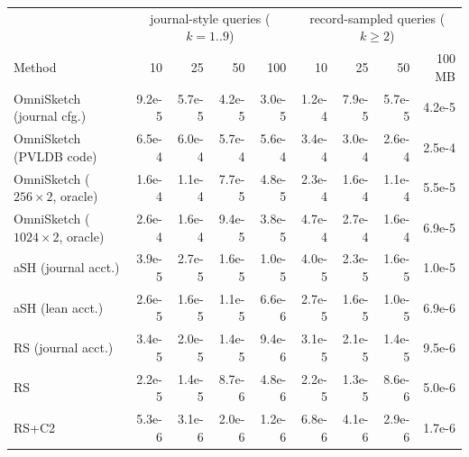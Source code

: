 \begin{tabular}{lrrrrrrrr}
\toprule
 & \multicolumn{4}{c}{journal-style queries ($k=1..9$)} & \multicolumn{4}{c}{record-sampled queries ($k\ge2$)} \\
Method & 10 & 25 & 50 & 100 & 10 & 25 & 50 & 100 MB \\
\midrule
OmniSketch (journal cfg.) & 9.2e-5 & 5.7e-5 & 4.2e-5 & 3.0e-5 & 1.2e-4 & 7.9e-5 & 5.7e-5 & 4.2e-5 \\
OmniSketch (PVLDB code) & 6.5e-4 & 6.0e-4 & 5.7e-4 & 5.6e-4 & 3.4e-4 & 3.0e-4 & 2.6e-4 & 2.5e-4 \\
OmniSketch ($256{\times}2$, oracle) & 1.6e-4 & 1.1e-4 & 7.7e-5 & 4.8e-5 & 2.3e-4 & 1.6e-4 & 1.1e-4 & 5.5e-5 \\
OmniSketch ($1024{\times}2$, oracle) & 2.6e-4 & 1.6e-4 & 9.4e-5 & 3.8e-5 & 4.7e-4 & 2.7e-4 & 1.6e-4 & 6.9e-5 \\
\addlinespace[2pt]
aSH (journal acct.) & 3.9e-5 & 2.7e-5 & 1.6e-5 & 1.0e-5 & 4.0e-5 & 2.3e-5 & 1.6e-5 & 1.0e-5 \\
aSH (lean acct.) & 2.6e-5 & 1.6e-5 & 1.1e-5 & 6.6e-6 & 2.7e-5 & 1.6e-5 & 1.0e-5 & 6.9e-6 \\
RS (journal acct.) & 3.4e-5 & 2.0e-5 & 1.4e-5 & 9.4e-6 & 3.1e-5 & 2.1e-5 & 1.4e-5 & 9.5e-6 \\
\addlinespace[2pt]
RS & 2.2e-5 & 1.4e-5 & 8.7e-6 & 4.8e-6 & 2.2e-5 & 1.3e-5 & 8.6e-6 & 5.0e-6 \\
RS+C2 & 5.3e-6 & 3.1e-6 & 2.0e-6 & 1.2e-6 & 6.8e-6 & 4.1e-6 & 2.9e-6 & 1.7e-6 \\
\bottomrule
\end{tabular}
